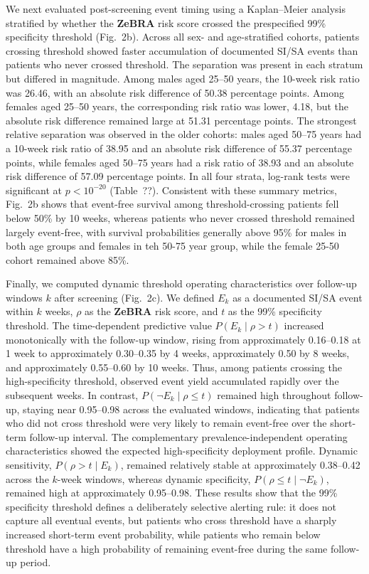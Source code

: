 \documentclass[onecolumn, compsoc,11pt]{IEEEtran}
\def\zebra{\textbf{ZeBRA}\xspace}
\def\zebra{\textbf{ZeBRA}\xspace}
\begin{document}
We next evaluated post-screening event timing using a Kaplan--Meier analysis stratified by whether the \zebra risk score crossed the prespecified 99\% specificity threshold (Fig.~2b). Across all sex- and age-stratified cohorts, patients crossing threshold showed faster accumulation of documented SI/SA events than patients who never crossed threshold. The separation was present in each stratum but differed in magnitude. Among males aged 25--50 years, the 10-week risk ratio was 26.46, with an absolute risk difference of 50.38 percentage points. Among females aged 25--50 years, the corresponding risk ratio was lower, 4.18, but the absolute risk difference remained large at 51.31 percentage points. The strongest relative separation was observed in the older cohorts: males aged 50--75 years had a 10-week risk ratio of 38.95 and an absolute risk difference of 55.37 percentage points, while females aged 50--75 years had a risk ratio of 38.93 and an absolute risk difference of 57.09 percentage points. In all four strata, log-rank tests were significant at $p < 10^{-20}$ (Table~??). Consistent with these summary metrics, Fig.~2b shows that event-free survival among threshold-crossing patients fell below 50\% by 10 weeks, whereas patients who never crossed threshold remained largely event-free, with survival probabilities generally above 95\% for males in both age groups and females in teh 50-75 year group, while the female 25-50 cohort remained above 85\%.


Finally, we computed dynamic threshold operating characteristics over follow-up windows \(k\) after screening (Fig.~2c). We defined \(E_k\) as a documented SI/SA event within \(k\) weeks, \(\rho\) as the \zebra risk score, and \(t\) as the 99\% specificity threshold. The time-dependent predictive value \(P(E_k \mid \rho > t)\) increased monotonically with the follow-up window, rising from approximately 0.16--0.18 at 1 week to approximately 0.30--0.35 by 4 weeks, approximately 0.50 by 8 weeks, and approximately 0.55--0.60 by 10 weeks. Thus, among patients crossing the high-specificity threshold, observed event yield accumulated rapidly over the subsequent weeks. In contrast, \(P(\neg E_k \mid \rho \leq t)\) remained high throughout follow-up, staying near 0.95--0.98 across the evaluated windows, indicating that patients who did not cross threshold were very likely to remain event-free over the short-term follow-up interval.
The complementary prevalence-independent operating characteristics showed the expected high-specificity deployment profile. Dynamic sensitivity, \(P(\rho > t \mid E_k)\), remained relatively stable at approximately 0.38--0.42 across the \(k\)-week windows, whereas dynamic specificity, \(P(\rho \leq t \mid \neg E_k)\), remained high at approximately 0.95--0.98. These results show that the 99\% specificity threshold defines a deliberately selective alerting rule: it does not capture all eventual events, but patients who cross threshold have a sharply increased short-term event probability, while patients who remain below threshold have a high probability of remaining event-free during the same follow-up period.
\end{document}
